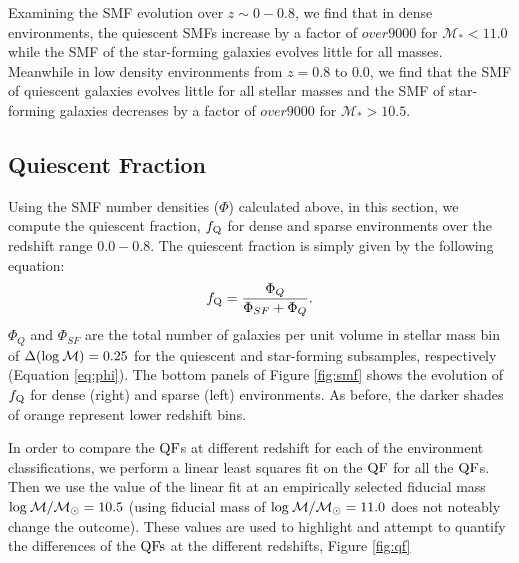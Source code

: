 \documentclass{emulateapj}
\begin{document}
Examining the SMF evolution over $z \sim 0 - 0.8$, we find that in dense 
environments, the quiescent SMFs increase by a factor of $over9000$ 
for $\mathcal{M}_{*} < 11.0$ while the SMF of the star-forming 
galaxies evolves little for all masses. Meanwhile in low density 
environments from $z=0.8$ to $0.0$, we find that the SMF of 
quiescent galaxies evolves little for all stellar masses and the 
SMF of star-forming galaxies decreases by a factor of $over9000$ 
for $\mathcal{M}_{*} > 10.5$.  

\subsection{Quiescent Fraction} \label{sec:qf_const}
Using the SMF number densities ($\Phi$) calculated above, 
in this section, we compute the quiescent fraction, $f_{\rm{Q}}$ 
for dense and sparse environments over the redshift range 
$0.0 - 0.8$.  The quiescent fraction is simply given by the following 
equation: 
\begin{equation}
f_{\rm{Q}} = \frac{\Phi_{Q}}{\Phi_{SF}+\Phi_{Q}}.
\end{equation}
$\Phi_{Q}$ and $\Phi_{SF}$ are the total number of galaxies 
per unit volume in stellar mass bin of $\Delta(\rm{log} \: \mathcal{M}) = 0.25$ 
for the quiescent and star-forming subsamples, respectively 
(Equation \ref{eq:phi}). The bottom panels of Figure \ref{fig:smf} 
shows the evolution of $f_{\rm{Q}}$ for dense (right) and sparse (left)
environments. As before, the darker shades of orange represent 
lower redshift bins. 


In order to compare the $\rm{QF}$s at different redshift for each of the environment classifications, we perform a linear least squares fit on the $\rm{QF}$ for all the $\rm{QF}$s. 
Then we use the value of the linear fit at an empirically selected fiducial mass $\rm{log} \: \mathcal{M}/\mathcal{M}_{\odot} = 10.5$ (using fiducial mass of $\rm{log} \: \mathcal{M}/
\mathcal{M}_\odot = 11.0$ does not noteably change the outcome).
These values are used to highlight and attempt to quantify the differences of the $\rm{QFs}$ at the different redshifts, Figure \ref{fig:qf}
\end{document}
